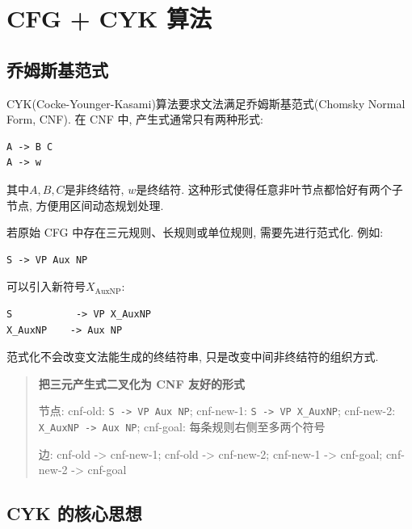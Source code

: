 \section{CFG + CYK 算法}


\subsection{乔姆斯基范式}


CYK(Cocke-Younger-Kasami)算法要求文法满足乔姆斯基范式(Chomsky Normal Form, CNF).
在 CNF 中, 产生式通常只有两种形式:

\begin{Verbatim}[breaklines=true,breakanywhere=true,fontsize=\small]
A -> B C
A -> w
\end{Verbatim}

其中$A, B, C$是非终结符, $w$是终结符.
这种形式使得任意非叶节点都恰好有两个子节点, 方便用区间动态规划处理.

若原始 CFG 中存在三元规则、长规则或单位规则, 需要先进行范式化.
例如:

\begin{Verbatim}[breaklines=true,breakanywhere=true,fontsize=\small]
S -> VP Aux NP
\end{Verbatim}

可以引入新符号$X_{\operatorname{AuxNP}}$:

\begin{Verbatim}[breaklines=true,breakanywhere=true,fontsize=\small]
S           -> VP X_AuxNP
X_AuxNP    -> Aux NP
\end{Verbatim}

范式化不会改变文法能生成的终结符串, 只是改变中间非终结符的组织方式.

\begin{quote}
\small
\textbf{把三元产生式二叉化为 CNF 友好的形式}
\par 节点: cnf-old: \texttt{S -\textgreater{} VP Aux NP}; cnf-new-1: \texttt{S -\textgreater{} VP X\_AuxNP}; cnf-new-2: \texttt{X\_AuxNP -\textgreater{} Aux NP}; cnf-goal: 每条规则右侧至多两个符号
\par 边: cnf-old -\textgreater{} cnf-new-1; cnf-old -\textgreater{} cnf-new-2; cnf-new-1 -\textgreater{} cnf-goal; cnf-new-2 -\textgreater{} cnf-goal
\end{quote}

\subsection{CYK 的核心思想}


